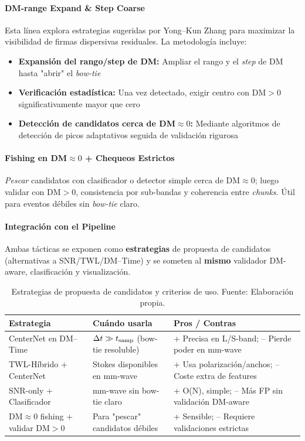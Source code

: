 \paragraph{DM-range Expand \& Step Coarse}

Esta línea explora estrategias sugeridas por Yong–Kun Zhang \cite{zhang2024drafts} para maximizar la visibilidad de firmas dispersivas residuales. La metodología incluye:

\begin{itemize}
\item \textbf{Expansión del rango/step de DM:} Ampliar el rango y el \textit{step} de DM hasta "abrir" el \textit{bow-tie}
\item \textbf{Verificación estadística:} Una vez detectado, exigir centro con DM$>0$ significativamente mayor que cero
\item \textbf{Detección de candidatos cerca de DM$\approx 0$:} Mediante algoritmos de detección de picos adaptativos seguida de validación rigurosa
\end{itemize}

\paragraph{Fishing en DM$\approx 0$ + Chequeos Estrictos}

\textit{Pescar} candidatos con clasificador o detector simple cerca de DM$\approx 0$; luego validar con DM$>0$, consistencia por sub-bandas y coherencia entre \emph{chunks}. Útil para eventos débiles sin \textit{bow-tie} claro.

\paragraph{Integración con el Pipeline}

Ambas tácticas se exponen como \textbf{estrategias} de propuesta de candidatos (alternativas a SNR/TWL/DM--Time) y se someten al \textbf{mismo} validador DM-aware, clasificación y visualización.

\begin{table}[H] 
\centering 
  \caption{Estrategias de propuesta de candidatos y criterios de uso. Fuente: Elaboración propia.}
  \label{tab:estrategias}
\begin{tabular}{|l|l|l|} 
\toprule 
\textbf{Estrategia} & \textbf{Cuándo usarla} & \textbf{Pros / Contras} \\ 
\midrule 
CenterNet en DM--Time & $\Delta t \gg t_{\rm samp}$ (bow-tie resoluble) & + Precisa en L/S-band; -- Pierde poder en mm-wave \\ 
TWL-Híbrido + CenterNet & Stokes disponibles en mm-wave & + Usa polarización/anchos; -- Coste extra de features \\ 
SNR-only + Clasificador & mm-wave sin bow-tie claro & + O(N), simple; -- Más FP sin validación DM-aware \\ 
DM$\approx 0$ fishing + validar DM$>0$ & Para "pescar" candidatos débiles & + Sensible; -- Requiere validaciones estrictas \\ 
\bottomrule 
\end{tabular} 
\end{table}

